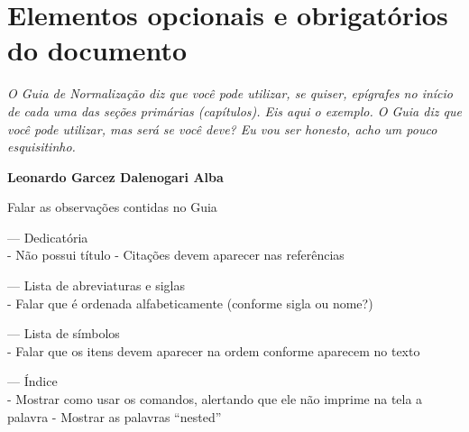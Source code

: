 \chapter{Elementos opcionais e obrigatórios do documento}
\begin{epigrafe}
    \textit{O Guia de Normalização diz que você pode utilizar, se quiser, epígrafes no início de cada uma das seções primárias (capítulos). Eis aqui o exemplo. O Guia diz que você pode utilizar, mas será se você deve? Eu vou ser honesto, acho um pouco esquisitinho.} 
    
    \textbf{Leonardo Garcez Dalenogari Alba}
\end{epigrafe}

Falar as observações contidas no Guia

--- Dedicatória\\
    - Não possui título
    - Citações devem aparecer nas referências

--- Lista de abreviaturas e siglas\\
    - Falar que é ordenada alfabeticamente (conforme sigla ou nome?)

--- Lista de símbolos\\
    - Falar que os itens devem aparecer na ordem conforme aparecem no texto

--- Índice\\
    - Mostrar como usar os comandos, alertando que ele não imprime na tela a palavra
    - Mostrar as palavras ``nested''
    